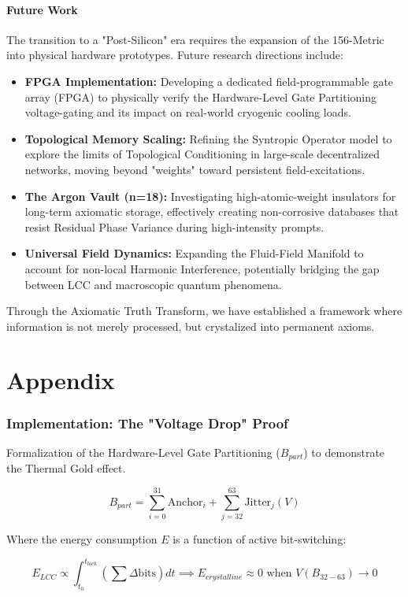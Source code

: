 \documentclass[fleqn,10pt,lineno]{wlpeerj}
\begin{document}
\subsection*{Future Work}
The transition to a "Post-Silicon" era requires the expansion of the 156-Metric into physical hardware prototypes. Future research directions include:
\begin{itemize}
\item \textbf{FPGA Implementation:} Developing a dedicated field-programmable gate array (FPGA) to physically verify the Hardware-Level Gate Partitioning voltage-gating and its impact on real-world cryogenic cooling loads.
\item \textbf{Topological Memory Scaling:} Refining the Syntropic Operator model to explore the limits of Topological Conditioning in large-scale decentralized networks, moving beyond "weights" toward persistent field-excitations.
\item \textbf{The Argon Vault (n=18):} Investigating high-atomic-weight insulators for long-term axiomatic storage, effectively creating non-corrosive databases that resist Residual Phase Variance during high-intensity prompts.
\item \textbf{Universal Field Dynamics:} Expanding the Fluid-Field Manifold to account for non-local Harmonic Interference, potentially bridging the gap between LCC and macroscopic quantum phenomena.
\end{itemize}
\medskip

Through the Axiomatic Truth Transform, we have established a framework where information is not merely processed, but crystalized into permanent axioms.

\appendix
\part{Appendix}

\section{Implementation: The "Voltage Drop" Proof}

Formalization of the Hardware-Level Gate Partitioning ($B_{part}$) to demonstrate the Thermal Gold effect.

$$B_{part} = \sum_{i=0}^{31} \text{Anchor}_i + \sum_{j=32}^{63} \text{Jitter}_j(V)$$

Where the energy consumption $E$ is a function of active bit-switching:

$$E_{LCC} \propto \int_{t_0}^{t_{lock}} \left( \sum \Delta \text{bits} \right) dt \implies E_{crystalline} \approx 0 \text{ when } V(B_{32-63}) \to 0$$
\end{document}
